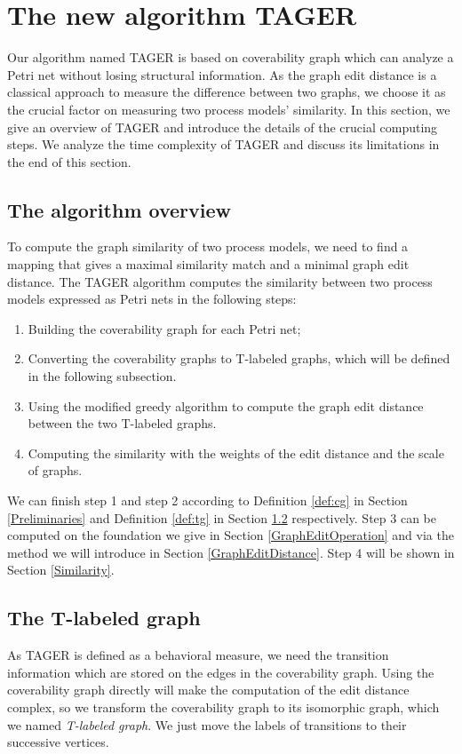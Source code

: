 \documentclass{llncs}
\begin{document}
\section{The new algorithm TAGER}\label{Algorithm}
Our algorithm named TAGER is based on coverability graph which can analyze a Petri net without losing structural information. As the graph edit distance is a classical approach to measure the difference between two graphs, we choose it as the crucial factor on measuring two process models' similarity.
In this section, we give an overview of TAGER and introduce the details of the crucial computing steps. We analyze the time complexity of TAGER and discuss its limitations in the end of this section.

\subsection{The algorithm overview}\label{algorithmOverview}
To compute the graph similarity of two process models, we need to find a mapping that gives a maximal similarity match and a minimal graph edit distance. The TAGER algorithm computes the similarity between two process models expressed as Petri nets in the following steps:
\begin{enumerate}
\item Building the coverability graph for each Petri net;
\item Converting the coverability graphs to T-labeled graphs, which will be defined in the following subsection.
\item Using the modified greedy algorithm to compute the graph edit distance between the two T-labeled graphs.
\item Computing the similarity with the weights of the edit distance and the scale of graphs.
\end{enumerate}
We can finish step 1 and step 2 according to Definition \ref{def:cg} in Section \ref{Preliminaries} and Definition \ref{def:tg} in Section \ref{tlabelgraph} respectively. Step 3 can be computed on the foundation we give in Section \ref{GraphEditOperation} and via the method we will introduce in Section \ref{GraphEditDistance}. Step 4 will be shown in Section \ref{Similarity}.

\subsection{The T-labeled graph}\label{tlabelgraph}
As TAGER is defined as a behavioral measure, we need the transition information which are stored on the edges in the coverability graph. Using the coverability graph directly will make the computation of the edit distance complex, so we transform the coverability graph to its isomorphic graph, which we named \textit{T-labeled graph}. We just move the labels of transitions to their successive vertices.
\end{document}

